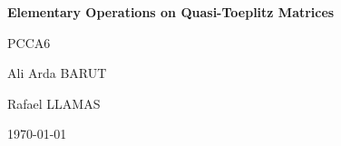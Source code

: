 \documentclass[a4paper, 11pt]{article}
\begin{document}
\begin{titlepage}
  \centering
  \vspace*{5cm}
  {\Huge \textbf{Elementary Operations on Quasi-Toeplitz Matrices} \par}
  \vspace*{0.5cm}
  {\Large PCCA6 \par}
  \vfill
  {\Large Ali Arda BARUT \par}
  {\Large Rafael LLAMAS \par}
  \vspace*{1cm}
  {\large \today \par}
\end{titlepage}
\tableofcontents
\vspace*{\fill}
\noindent
{}
\newpage








\newpage



\newpage

\end{document}
